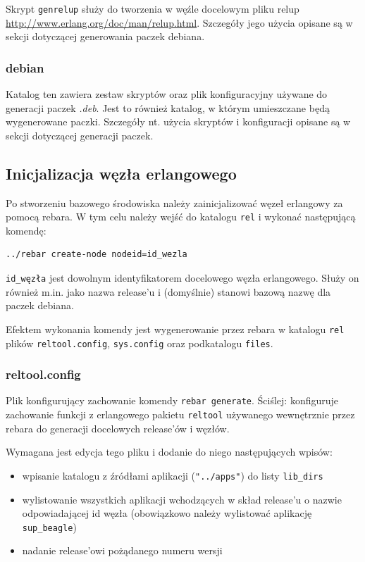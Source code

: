 \documentclass[polish,12pt]{aghthesis}
\begin{document}
Skrypt \texttt{genrelup} służy do tworzenia w węźle docelowym pliku relup \url{http://www.erlang.org/doc/man/relup.html}. Szczegóły jego użycia opisane są w sekcji dotyczącej generowania paczek debiana.
\subsubsection{debian}
Katalog ten zawiera zestaw skryptów oraz plik konfiguracyjny używane do generacji paczek \emph{.deb}. Jest to również katalog, w którym umieszczane będą wygenerowane paczki. Szczegóły nt. użycia skryptów i konfiguracji opisane są w sekcji dotyczącej generacji paczek.

\subsection{Inicjalizacja węzła erlangowego}
Po stworzeniu bazowego środowiska należy zainicjalizować węzeł erlangowy za pomocą rebara. W tym celu należy wejść do katalogu \texttt{rel} i wykonać następującą komendę:
\begin{verbatim}
../rebar create-node nodeid=id_wezla
\end{verbatim}

\texttt{id\_węzła} jest dowolnym identyfikatorem docelowego węzła erlangowego. Służy on również m.in. jako nazwa release'u i (domyślnie) stanowi bazową nazwę dla paczek debiana.

Efektem wykonania komendy jest wygenerowanie przez rebara w katalogu \texttt{rel} plików \texttt{reltool.config}, \texttt{sys.config} oraz podkatalogu \texttt{files}.

\subsubsection{reltool.config}

Plik konfigurujący zachowanie komendy \texttt{rebar generate}. Ściślej: konfiguruje zachowanie funkcji z erlangowego pakietu \texttt{reltool} używanego wewnętrznie przez rebara do generacji docelowych release'ów i węzłów.

Wymagana jest edycja tego pliku i dodanie do niego następujących wpisów:
\begin{itemize}
\item wpisanie katalogu z źródłami aplikacji (\texttt{"../apps"}) do listy \texttt{lib\_dirs}
\item wylistowanie wszystkich aplikacji wchodzących w skład release'u o nazwie odpowiadającej id węzła (obowiązkowo należy wylistować aplikację \texttt{sup\_beagle})
\item nadanie release'owi pożądanego numeru wersji
\end{itemize}
\end{document}
